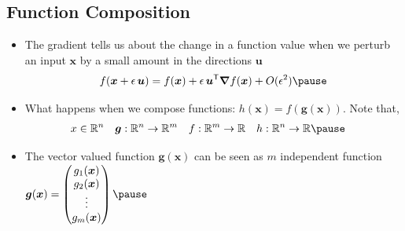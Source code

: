\begin{slide}
\section[-2]{Function Composition}

\begin{PauseHighLight}
  \begin{itemize}
  \item The gradient tells us about the change in a function value
    when we perturb an input $\bm{x}$ by a small amount in the
    directions $\bm{u}$
    \begin{align*}
      f(\bm{x}+\epsilon \, \bm{u}) = f(\bm{x}) + \epsilon\,
      \bm{u}^\tr \grad f(\bm{x}) + O(\epsilon^2)\pause
    \end{align*}
  \item What happens when we compose functions: $h(\bm{x}) =
    f(\bm{g}(\bm{x}))$\pause.  Note
    that,
    \begin{align*}
      x&\in \mathbb{R}^n
      & \bm{g}:\mathbb{R}^n & \rightarrow \mathbb{R}^m
      & f:\mathbb{R}^m & \rightarrow \mathbb{R}
      & h:\mathbb{R}^n & \rightarrow \mathbb{R}\pause
    \end{align*}
  \item The vector valued function $\bm{g}(\bm{x})$ can be seen as $m$
    independent function $
      \bm{g}(\bm{x}) =
      \begin{pmatrix}
        g_1(\bm{x}) \\ g_2(\bm{x}) \\ \vdots \\ g_m(\bm{x})
      \end{pmatrix}\pause$
  \end{itemize}
\end{PauseHighLight}
\end{slide}



